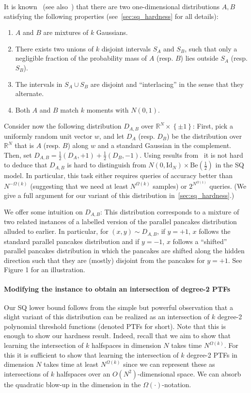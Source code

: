 \documentclass{theoretics}
\newcommand{\Set}[1]{\left\{#1\right\}}
\newcommand{\R}{\mathbb R}
\newcommand*{\Id}{\mathrm{Id}}
\newcommand{\Be}[1]{\mathrm{Be}(#1)}
\begin{document}
It is known~\cite{bubeck2019adversarial} (see also~\cite{DKS17}) that there are two one-dimensional distributions $A,B$ satisfying the following properties (see~\cref{sec:sq_hardness} for all details):
\begin{enumerate}
    \item $A$ and $B$ are mixtures of $k$ Gaussians.
    \item There exists two unions of $k$ disjoint intervals $S_A$ and $S_B$, such that only a negligible fraction of the probability mass of $A$ (resp. $B$) lies outside $S_A$ (resp. $S_B$).
    \item The intervals in $S_A \cup S_B$ are disjoint and ``interlacing'' in the sense that they alternate.
    \item Both $A$ and $B$ match $k$ moments with $N(0,1)$.
\end{enumerate}
Consider now the following distribution $D_{A,B}$ over $\R^N\times\Set{\pm 1}$: First, pick a uniformly random unit vector $w$, and let $D_A$ (resp. $D_B$) be the distribution over $\R^N$ that is $A$ (resp. $B$) along $w$ and a standard Gaussian in the complement.
Then, set $D_{A,B} = \tfrac 1 2 (D_A, +1) + \tfrac 1 2 (D_B, -1)$.
Using results from~\cite{bubeck2019adversarial,DK22} it is not hard to deduce that $D_{A,B}$ is hard to distinguish from $N(0,\Id_N) \times \Be{\tfrac 1 2}$ in the SQ model.
In particular, this task either requires queries of accuracy better than $N^{-\Omega(k)}$ (suggesting that we need at least $N^{\Omega(k)}$ samples) or $2^{N^{\Omega(1)}}$ queries.
(We give a full argument for our variant of this distribution in~\cref{sec:sq_hardness}.)

We offer some intuition on $D_{A,B}$:
This distribution corresponds to a mixture of two related instances of a labelled version of the parallel pancakes distribution alluded to earlier.
In particular, for $(x,y) \sim D_{A,B}$, if $y = +1$, $x$ follows the standard parallel pancakes distribution and if $y = -1$, $x$ follows a ``shifted'' parallel pancakes distribution in which the pancakes are shifted along the hidden direction such that they are (mostly) disjoint from the pancakes for $y = +1$.
See Figure 1 for an illustration.


\paragraph{Modifying the instance to obtain an intersection of degree-2 PTFs}
Our SQ lower bound follows from the simple but powerful observation that a slight variant of this distribution can be realized as an intersection of $k$ degree-2 polynomial threshold functions (denoted PTFs for short).
Note that this is enough to show our hardness result.
Indeed, recall that we aim to show that learning the intersection of $k$ halfspaces in dimension $N$ takes time $N^{\Omega(k)}$.
For this it is sufficient to show that learning the intersection of $k$ degree-2 PTFs in dimension $N$ takes time at least $N^{\Omega(k)}$ since we can represent these as intersections of $k$ halfspaces over an $O(N^2)$-dimensional space.
We can absorb the quadratic blow-up in the dimension in the $\Omega(\cdot)$-notation.
\end{document}
